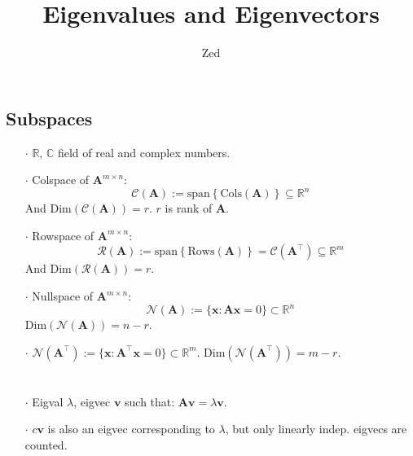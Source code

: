 \documentclass[a4paper, 11pt]{article}
\title{\textbf{Eigenvalues and Eigenvectors}}
\author{Zed}
\begin{document}
\maketitle
\section{}
\subsection{Subspaces}
\begin{itemize}
  \item[$\cdot$] $\mathbb{R}$, $\mathbb{C}$ field of real and complex numbers.
  \item[$\cdot$] Colspace of $\bm{A}^{m\times n}$: 
  $$
  \mathcal{C}(\bm{A}):=\text{span}\left\{\text{Cols}(\bm{A})\right\}\subseteq \mathbb{R}^n
  $$
  And $\text{Dim}(\mathcal{C}(\bm{A}))=r$. $r$ is rank of $\bm{A}$.

  \item[$\cdot$] Rowspace of $\bm{A}^{m\times n}$: 
  $$
  \mathcal{R}(\bm{A}):=\text{span}\left\{\text{Rows}(\bm{A})\right\}=\mathcal{C}(\pmb{A}^{\top})\subseteq \mathbb{R}^m
  $$ 
  And $\text{Dim}(\mathcal{R}(\bm{A}))=r$.

  \item[$\cdot$] Nullspace of $\bm{A}^{m\times n}$: 
  $$
  \mathcal{N}(\bm{A}):=\{\bm{x}: \bm{Ax}=0\}\subset \mathbb{R}^n
  $$ 
  $\text{Dim}(\mathcal{N}(\bm{A}))=n-r$.

  \item[$\cdot$] $\mathcal{N}(\pmb{A}^{\top}):=\{\bm{x}: \bm{\pmb{A}^{\top}x}=0\}\subset \mathbb{R}^m$. $\text{Dim}(\mathcal{N}(\pmb{A}^{\top}))=m-r$.
\end{itemize}
\section{}
\begin{itemize}
  \item[$\cdot$] Eigval $\lambda$, eigvec $\bm{v}$ such that: $\bm{A} \bm{v} = \lambda \bm{v}$.
  \item[$\cdot$]$c \bm{v}$ is also an eigvec corresponding to $\lambda$, but only linearly indep. eigvecs are counted.
\end{itemize}
\end{document}
